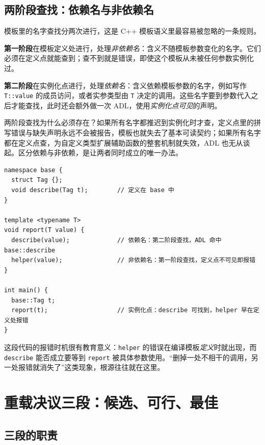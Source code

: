 \documentclass[12pt,a4paper,fontset=fandol]{ctexbook}
\newcommand{\cpp}[1]{C++#1}
\newcommand{\Tp}[1]{\texttt{#1}}
\begin{document}
\subsection{两阶段查找：依赖名与非依赖名}\label{sec:cl03-lookup-twophase}

模板里的名字查找分两次进行，这是 \cpp{} 模板语义里最容易被忽略的一条规则。

\textbf{第一阶段}在模板定义处进行，处理\emph{非依赖名}：含义不随模板参数变化的名字。它们必须在定义点就能查到；查不到就是错误，即使这个模板从未被任何参数实例化过。

\textbf{第二阶段}在实例化点进行，处理\emph{依赖名}：含义依赖模板参数的名字，例如写作 \Tp{T::value} 的成员访问，或者实参类型由 \Tp{T} 决定的调用。这些名字要到参数代入之后才能查找，此时还会额外做一次 ADL，使用\emph{实例化点可见}的声明。

两阶段查找为什么必须存在？如果所有名字都推迟到实例化时才查，定义点里的拼写错误与缺失声明永远不会被报告，模板也就失去了基本可读契约；如果所有名字都在定义点查，为自定义类型扩展辅助函数的整套机制就失效，ADL 也无从谈起。区分依赖与非依赖，是让两者同时成立的唯一办法。

\begin{lstlisting}[style=cppstyle,caption={同一个模板里的两个名字在不同阶段被查}]
namespace base {
  struct Tag {};
  void describe(Tag t);        // 定义在 base 中
}

template <typename T>
void report(T value) {
  describe(value);             // 依赖名：第二阶段查找，ADL 命中 base::describe
  helper(value);               // 非依赖名：第一阶段查找，定义点不可见即报错
}

int main() {
  base::Tag t;
  report(t);                   // 实例化点：describe 可找到，helper 早在定义处报错
}
\end{lstlisting}

这段代码的报错时机很有教育意义：\Tp{helper} 的错误在编译模板\emph{定义}时就出现，而 \Tp{describe} 能否成立要等到 \Tp{report} 被具体参数使用。“删掉一处不相干的调用，另一处报错就消失了”这类现象，根源往往就在这里。

\section{重载决议三段：候选、可行、最佳}\label{sec:cl03-overload}

\subsection{三段的职责}\label{sec:cl03-overload-stages}
\end{document}
